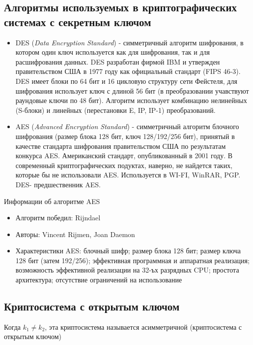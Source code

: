 \subsection{Алгоритмы используемых в криптографических системах с секретным ключом}

\begin{itemize}[label={--},noitemsep,nolistsep]
	\item DES (\textit{Data Encryption Standard}) - симметричный алгоритм шифрования, в котором один ключ используется как для шифрования, так и для расшифрования данных. DES разработан фирмой IBM и утвержден правительством США в 1977 году как официальный стандарт (FIPS 46-3). DES имеет блоки по 64 бит и 16 цикловую структуру сети Фейстеля, для шифрования использует ключ с длиной 56 бит (в преобразовании учавствуют раундовые ключи по 48 бит). Алгоритм использует комбинацию нелинейных (S-блоки) и линейных (перестановки E, IP, IP-1) преобразований.
	\item AES (\textit{Advanced Encryption Standard}) - симметричный алгоритм блочного шифрования (размер блока 128 бит, ключ 128/192/256 бит), принятый в качестве стандарта шифрования правительством США по результатам конкурса AES. Американский стандарт, опубликованный в 2001 году. В современный криптографических подуктах, наверно, не найдется таких, которые бы не использовали AES. Используется в WI-FI, WinRAR, PGP. DES- предшественник AES. \cite{bmstucrypto}
\end{itemize}

Информации об алгоритме AES
\begin{itemize}[label={--},noitemsep,nolistsep]
	\item Алгоритм победил: Rijndael

	\item Авторы: Vincent Rijmen, Joan Daemon 

	\item Характеристики AES: блочный шифр; размер блока 128 бит; размер ключа 128 бит (затем 192/256); эффективная программная и аппаратная реализация; возможность эффективной реализации на 32-ъх разрядных CPU; простота архитектура; отсутствие ограничений на использование
\end{itemize}

\subsection{Криптосистема с открытым ключом}
Когда $k_1 \neq k_2$, эта криптосистема называется асимметричной (криптосистема с открытым ключом)

